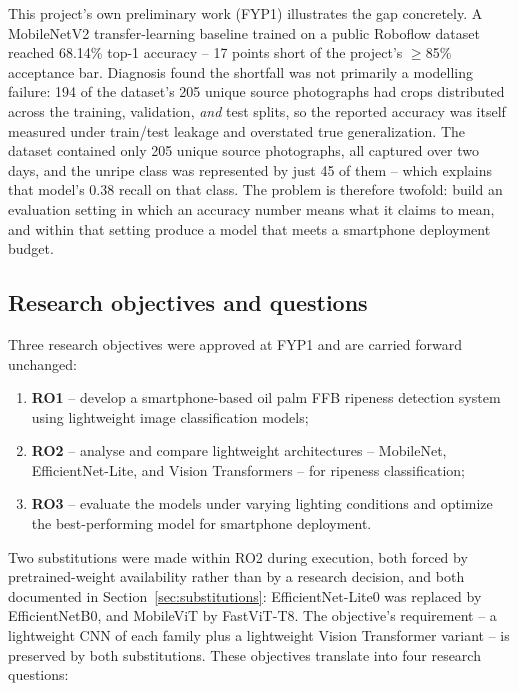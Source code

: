 \documentclass{article}
\begin{document}
This project's own preliminary work (FYP1) illustrates the gap concretely. A MobileNetV2
transfer-learning baseline trained on a public Roboflow dataset reached 68.14\% top-1 accuracy -- 17
points short of the project's $\geq$85\% acceptance bar. Diagnosis found the shortfall was not primarily a
modelling failure: 194 of the dataset's 205 unique source photographs had crops distributed across the
training, validation, \textit{and} test splits, so the reported accuracy was itself measured under
train/test leakage and overstated true generalization. The dataset contained only 205 unique source
photographs, all captured over two days, and the unripe class was represented by just 45 of them -- which
explains that model's 0.38 recall on that class. The problem is therefore twofold: build an evaluation
setting in which an accuracy number means what it claims to mean, and within that setting produce a model
that meets a smartphone deployment budget.

\subsection{Research objectives and questions}

Three research objectives were approved at FYP1 and are carried forward unchanged:

\begin{enumerate}
  \item \textbf{RO1} -- develop a smartphone-based oil palm FFB ripeness detection system using
  lightweight image classification models;
  \item \textbf{RO2} -- analyse and compare lightweight architectures -- MobileNet, EfficientNet-Lite, and
  Vision Transformers -- for ripeness classification;
  \item \textbf{RO3} -- evaluate the models under varying lighting conditions and optimize the
  best-performing model for smartphone deployment.
\end{enumerate}

Two substitutions were made within RO2 during execution, both forced by pretrained-weight availability
rather than by a research decision, and both documented in Section~\ref{sec:substitutions}:
EfficientNet-Lite0 was replaced by EfficientNetB0, and MobileViT by FastViT-T8. The objective's
requirement -- a lightweight CNN of each family plus a lightweight Vision Transformer variant -- is
preserved by both substitutions. These objectives translate into four research questions:
\end{document}

